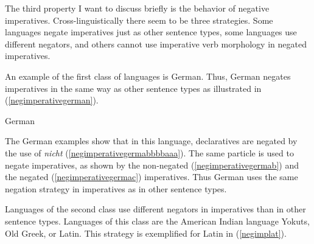 The third property I want to discuss briefly is the behavior of negative imperatives. Cross-linguistically there seem to be three strategies. Some languages negate imperatives just as other sentence types, some languages use different negators, and others cannot use imperative verb morphology in negated imperatives. 

An example of the first class of languages is German. Thus, German negates imperatives in the same way as other sentence types as illustrated in (\ref{negimperativegerman}). 

\begin{exe}
\ex German\label{negimperativegerman}
\begin{xlist}
\end{xlist}
\end{exe}

\noindent The German examples show that in this language, declaratives are negated by the use of \textit{nicht} (\ref{negimperativegermabbbbaaa}). The same particle is used to negate imperatives, as shown by the non-negated (\ref{negimperativegermab}) and the negated (\ref{negimperativegermac}) imperatives. Thus German uses the same negation strategy in imperatives as in other sentence types.%

Languages of the second class use different negators in imperatives than in other sentence types. Languages of this class are the American Indian language Yokuts, Old Greek, or Latin. This strategy is exemplified for Latin in (\ref{negimplat}).

